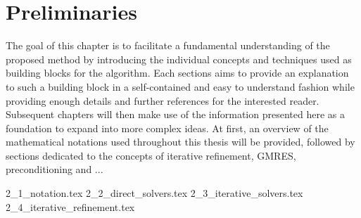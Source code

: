 \chapter{Preliminaries}
\label{chap:preliminaries}

The goal of this chapter is to facilitate a fundamental understanding of the proposed method by introducing the individual concepts and techniques used as building blocks for the algorithm. Each sections aims to provide an explanation to such a building block in a self-contained and easy to understand fashion while providing enough details and further references for the interested reader. Subsequent chapters will then make use of the information presented here as a foundation to expand into more complex ideas. At first, an overview of the mathematical notations used throughout this thesis will be provided, followed by sections dedicated to the concepts of iterative refinement, GMRES, preconditioning and ...

{2_1_notation.tex}
{2_2_direct_solvers.tex}
{2_3_iterative_solvers.tex}
{2_4_iterative_refinement.tex}